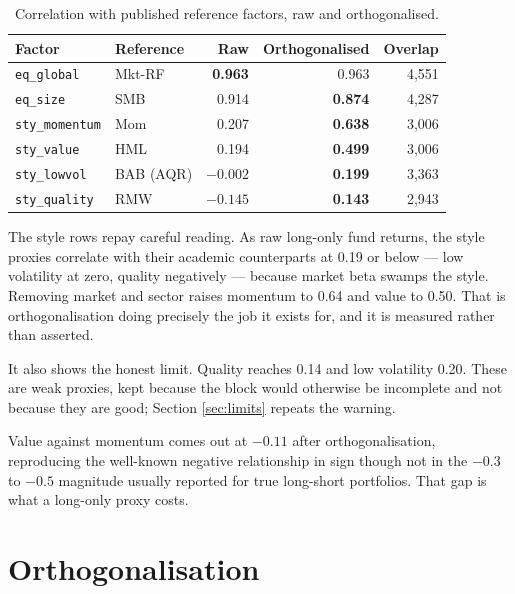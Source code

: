 \documentclass[11pt,a4paper]{article}
\newcommand{\code}[1]{\texttt{\small #1}}
\begin{document}
\begin{table}[htbp]
\centering
\caption{Correlation with published reference factors, raw and orthogonalised.}
\label{tab:refval}
\small
\begin{tabular}{@{}llrrr@{}}
\toprule
\textbf{Factor} & \textbf{Reference} & \textbf{Raw} & \textbf{Orthogonalised} & \textbf{Overlap} \\
\midrule
\code{eq\_global}    & Mkt-RF        & \textbf{0.963} & 0.963 & 4{,}551 \\
\code{eq\_size}      & SMB           & 0.914 & \textbf{0.874} & 4{,}287 \\
\code{sty\_momentum} & Mom           & 0.207 & \textbf{0.638} & 3{,}006 \\
\code{sty\_value}    & HML           & 0.194 & \textbf{0.499} & 3{,}006 \\
\code{sty\_lowvol}   & BAB (AQR)     & $-0.002$ & \textbf{0.199} & 3{,}363 \\
\code{sty\_quality}  & RMW           & $-0.145$ & \textbf{0.143} & 2{,}943 \\
\bottomrule
\end{tabular}
\end{table}

The style rows repay careful reading. As raw long-only fund returns, the style proxies
correlate with their academic counterparts at 0.19 or below --- low volatility at
zero, quality negatively --- because market beta swamps the style. Removing market
and sector raises momentum to 0.64 and value to 0.50. That is orthogonalisation doing
precisely the job it exists for, and it is measured rather than asserted.

It also shows the honest limit. Quality reaches 0.14 and low volatility 0.20. These
are weak proxies, kept because the block would otherwise be incomplete and not
because they are good; Section \ref{sec:limits} repeats the warning.

Value against momentum comes out at $-0.11$ after orthogonalisation, reproducing the
well-known negative relationship \citep{asness2013} in sign though not in the $-0.3$
to $-0.5$ magnitude usually reported for true long-short portfolios. That gap is what
a long-only proxy costs.

\section{Orthogonalisation}
\label{sec:orth}
\end{document}

